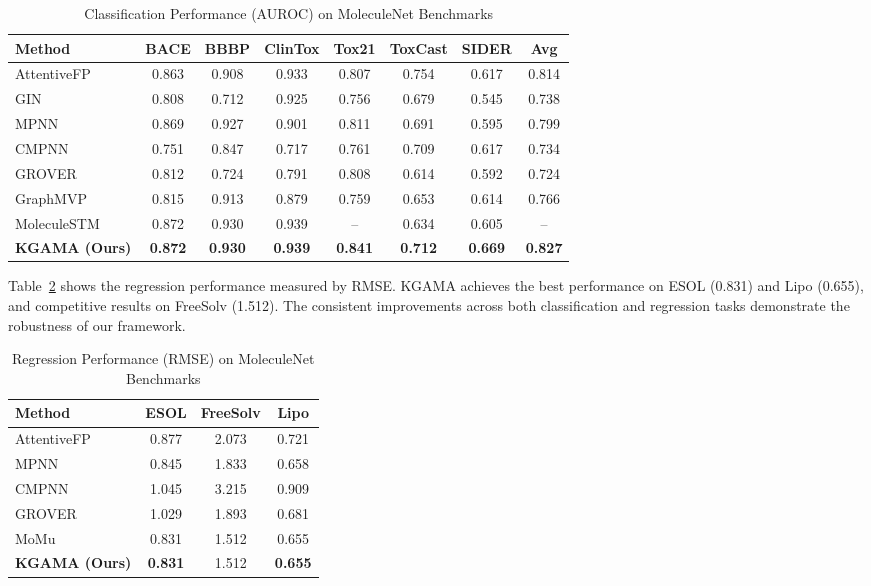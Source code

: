 \documentclass[journal]{IEEEtran}
\begin{document}
\FloatBarrier
\begin{table}[htbp]
\caption{Classification Performance (AUROC) on MoleculeNet Benchmarks}
\label{tab:classification}
\centering
\begin{tabular}{@{}lccccccc@{}}
\toprule
\textbf{Method} & \textbf{BACE} & \textbf{BBBP} & \textbf{ClinTox} & \textbf{Tox21} & \textbf{ToxCast} & \textbf{SIDER} & \textbf{Avg} \\
\midrule
AttentiveFP & 0.863 & 0.908 & 0.933 & 0.807 & 0.754 & 0.617 & 0.814 \\
GIN & 0.808 & 0.712 & 0.925 & 0.756 & 0.679 & 0.545 & 0.738 \\
MPNN & 0.869 & 0.927 & 0.901 & 0.811 & 0.691 & 0.595 & 0.799 \\
CMPNN & 0.751 & 0.847 & 0.717 & 0.761 & 0.709 & 0.617 & 0.734 \\
GROVER & 0.812 & 0.724 & 0.791 & 0.808 & 0.614 & 0.592 & 0.724 \\
GraphMVP & 0.815 & 0.913 & 0.879 & 0.759 & 0.653 & 0.614 & 0.766 \\
MoleculeSTM & 0.872 & 0.930 & 0.939 & -- & 0.634 & 0.605 & -- \\
\midrule
\textbf{KGAMA (Ours)} & \textbf{0.872} & \textbf{0.930} & \textbf{0.939} & \textbf{0.841} & \textbf{0.712} & \textbf{0.669} & \textbf{0.827} \\
\bottomrule
\end{tabular}
\end{table}
\FloatBarrier

Table~\ref{tab:regression} shows the regression performance measured by RMSE. KGAMA achieves the best performance on ESOL (0.831) and Lipo (0.655), and competitive results on FreeSolv (1.512). The consistent improvements across both classification and regression tasks demonstrate the robustness of our framework.

\begin{table}[htbp]
\caption{Regression Performance (RMSE) on MoleculeNet Benchmarks}
\label{tab:regression}
\centering
\begin{tabular}{@{}lccc@{}}
\toprule
\textbf{Method} & \textbf{ESOL} & \textbf{FreeSolv} & \textbf{Lipo} \\
\midrule
AttentiveFP & 0.877 & 2.073 & 0.721 \\
MPNN & 0.845 & 1.833 & 0.658 \\
CMPNN & 1.045 & 3.215 & 0.909 \\
GROVER & 1.029 & 1.893 & 0.681 \\
MoMu & 0.831 & 1.512 & 0.655 \\
\midrule
\textbf{KGAMA (Ours)} & \textbf{0.831} & 1.512 & \textbf{0.655} \\
\bottomrule
\end{tabular}
\end{table}
\FloatBarrier
\end{document}
